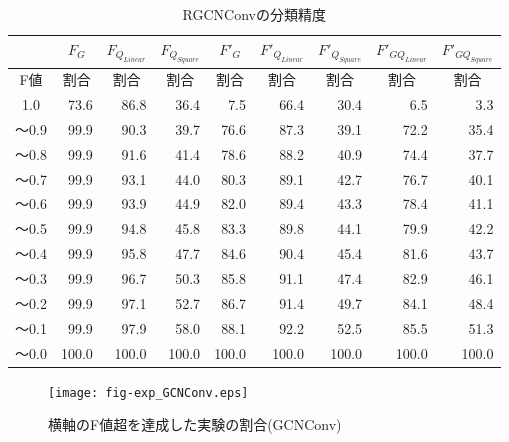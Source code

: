 \begin{table*}[tb]
\caption{RGCNConvの分類精度}\label{tbl:result_rgcnconv}
\centering
\begin{tabular}{|c|r|r|r|r|r|r|r|r|}\hline
  & \multicolumn{1}{|c|}{$F_{G}$} & \multicolumn{1}{|c|}{$F_{Q_{Linear}}$} & \multicolumn{1}{|c|}{$F_{Q_{Square}}$} & \multicolumn{1}{|c|}{$F'_{G}$} & \multicolumn{1}{|c|}{${F'}_{Q_{Linear}}$} & \multicolumn{1}{|c|}{${F'}_{Q_{Square}}$} & \multicolumn{1}{|c|}{${F'}_{GQ_{Linear}}$} & \multicolumn{1}{|c|}{${F'}_{GQ_{Square}}$}\\
  \hline
  \multicolumn{1}{|c|}{F値} & \multicolumn{1}{|c|}{割合} & \multicolumn{1}{|c|}{割合} & \multicolumn{1}{|c|}{割合} & \multicolumn{1}{|c|}{割合} & \multicolumn{1}{|c|}{割合} & \multicolumn{1}{|c|}{割合} & \multicolumn{1}{|c|}{割合} & \multicolumn{1}{|c|}{割合} \\
  \hline
  1.0   & 73.6 & 86.8 & 36.4 & 7.5 & 66.4 & 30.4 & 6.5 & 3.3 \\
  〜0.9 & 99.9 & 90.3 & 39.7 & 76.6 & 87.3 & 39.1 & 72.2 & 35.4 \\
  〜0.8 & 99.9 & 91.6 & 41.4 & 78.6 & 88.2 & 40.9 & 74.4 & 37.7 \\
  〜0.7 & 99.9 & 93.1 & 44.0 & 80.3 & 89.1 & 42.7 & 76.7 & 40.1 \\
  〜0.6 & 99.9 & 93.9 & 44.9 & 82.0 & 89.4 & 43.3 & 78.4 & 41.1 \\
  〜0.5 & 99.9 & 94.8 & 45.8 & 83.3 & 89.8 & 44.1 & 79.9 & 42.2 \\
  〜0.4 & 99.9 & 95.8 & 47.7 & 84.6 & 90.4 & 45.4 & 81.6 & 43.7 \\
  〜0.3 & 99.9 & 96.7 & 50.3 & 85.8 & 91.1 & 47.4 & 82.9 & 46.1 \\
  〜0.2 & 99.9 & 97.1 & 52.7 & 86.7 & 91.4 & 49.7 & 84.1 & 48.4 \\
  〜0.1 & 99.9 & 97.9 & 58.0 & 88.1 & 92.2 & 52.5 & 85.5 & 51.3 \\
  〜0.0 & 100.0 & 100.0 & 100.0 & 100.0 & 100.0 & 100.0 & 100.0 & 100.0 \\
  \hline
\end{tabular}
\end{table*}

\begin{figure*}[tb]
  \centering
  \texttt{[image: fig-exp\_GCNConv.eps]}
  \caption{横軸のF値超を達成した実験の割合(GCNConv)}\label{fig:result_gcnconv}
\end{figure*}

